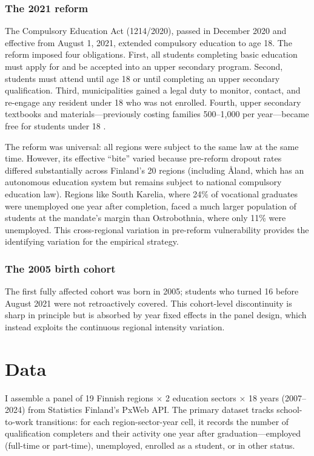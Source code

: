 \documentclass[12pt]{article}
\begin{document}
\subsubsection*{The 2021 reform} The Compulsory Education Act (1214/2020), passed in December 2020 and effective from August 1, 2021, extended compulsory education to age 18. The reform imposed four obligations. First, all students completing basic education must apply for and be accepted into an upper secondary program. Second, students must attend until age 18 or until completing an upper secondary qualification. Third, municipalities gained a legal duty to monitor, contact, and re-engage any resident under 18 who was not enrolled. Fourth, upper secondary textbooks and materials---previously costing families \texteuro{}500--1,000 per year---became free for students under 18 \citep{OKM2020}.

The reform was universal: all regions were subject to the same law at the same time. However, its effective ``bite'' varied because pre-reform dropout rates differed substantially across Finland's 20 regions (including \r{A}land, which has an autonomous education system but remains subject to national compulsory education law). Regions like South Karelia, where 24\% of vocational graduates were unemployed one year after completion, faced a much larger population of students at the mandate's margin than Ostrobothnia, where only 11\% were unemployed. This cross-regional variation in pre-reform vulnerability provides the identifying variation for the empirical strategy.

\subsubsection*{The 2005 birth cohort} The first fully affected cohort was born in 2005; students who turned 16 before August 2021 were not retroactively covered. This cohort-level discontinuity is sharp in principle but is absorbed by year fixed effects in the panel design, which instead exploits the continuous regional intensity variation.

\section{Data}

I assemble a panel of 19 Finnish regions $\times$ 2 education sectors $\times$ 18 years (2007--2024) from Statistics Finland's PxWeb API. The primary dataset tracks school-to-work transitions: for each region-sector-year cell, it records the number of qualification completers and their activity one year after graduation---employed (full-time or part-time), unemployed, enrolled as a student, or in other status.
\end{document}
